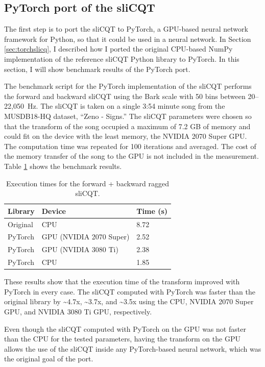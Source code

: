 \documentclass[report.tex]{subfiles}
\begin{document}
\subsection{PyTorch port of the sliCQT}
\label{sec:gpuexperimentpytorch}

The first step is to port the sliCQT to PyTorch, a GPU-based neural network framework for Python, so that it could be used in a neural network. In Section \ref{sec:torchslicq}, I described how I ported the original CPU-based NumPy implementation of the reference sliCQT Python library to PyTorch. In this section, I will show benchmark results of the PyTorch port.

The benchmark script for the PyTorch implementation of the sliCQT performs the forward and backward sliCQT using the Bark scale with 50 bins between \mbox{20--22,050 Hz}. The sliCQT is taken on a single 3:54 minute song from the MUSDB18-HQ dataset, ``Zeno - Signs.'' The sliCQT parameters were chosen so that the transform of the song occupied a maximum of 7.2 GB of memory and could fit on the device with the least memory, the NVIDIA 2070 Super GPU. The computation time was repeated for 100 iterations and averaged. The cost of the memory transfer of the song to the GPU is not included in the measurement. Table \ref{table:nsgttorchresultsragged} shows the benchmark results.

\begin{table}[ht]
	\centering
	\caption{Execution times for the forward + backward ragged sliCQT.}
	\label{table:nsgttorchresultsragged}
	\begin{tabular}{ |l|l|l| }
	 \hline
		Library & Device & Time (s) \\
	 \hline
	 \hline
		Original & CPU & 8.72 \\
	 \hline
		PyTorch & GPU (NVIDIA 2070 Super) & 2.52 \\
	 \hline
		PyTorch & GPU (NVIDIA 3080 Ti) & 2.38 \\
	 \hline
		PyTorch & CPU & 1.85 \\
	 \hline
\end{tabular}
\end{table}

These results show that the execution time of the transform improved with PyTorch in every case. The sliCQT computed with PyTorch was faster than the original library by \textasciitilde4.7x, \textasciitilde3.7x, and \textasciitilde3.5x using the CPU, NVIDIA 2070 Super GPU, and NVIDIA 3080 Ti GPU, respectively.

Even though the sliCQT computed with PyTorch on the GPU was not faster than the CPU for the tested parameters, having the transform on the GPU allows the use of the sliCQT inside any PyTorch-based neural network, which was the original goal of the port.
\end{document}
